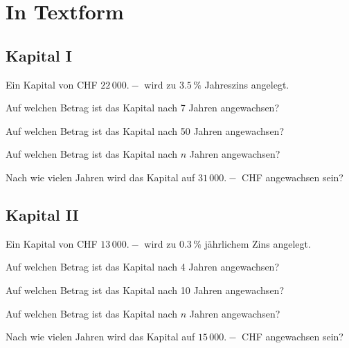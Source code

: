 \seitenUmbruchImAufgabenteil{}
\section{In Textform}
\subsection{Kapital I}
Ein Kapital von CHF $22\,000.-$ wird zu $3.5\,\%$ Jahreszins angelegt.
\begin{bbwAufgabenBlock}
\item Auf welchen Betrag ist das Kapital nach 7 Jahren
angewachsen? 
\item Auf welchen Betrag ist das Kapital nach 50 Jahren
angewachsen?  
\item Auf welchen Betrag ist das Kapital nach $n$ Jahren
angewachsen?   %
\item Nach wie vielen Jahren wird das Kapital auf $31\,000.-$ CHF
angewachsen sein? 
\end{bbwAufgabenBlock}
\platzFuerBerechnungenBisEndeSeite{}
\subsection{Kapital II}
Ein Kapital von CHF $13\,000.-$ wird zu $0.3\,\%$ jährlichem Zins angelegt.
\begin{bbwAufgabenBlock}
\item Auf welchen Betrag ist das Kapital nach 4 Jahren
angewachsen?  
\item Auf welchen Betrag ist das Kapital nach 10 Jahren
angewachsen?  \noTRAINER{\seitenUmbruchImAufgabenteil{}}
\item Auf welchen Betrag ist das Kapital nach $n$ Jahren
angewachsen?   %
\item Nach wie vielen Jahren wird das Kapital auf $15\,000.-$ CHF
angewachsen sein?  
\end{bbwAufgabenBlock}
\platzFuerBerechnungenBisEndeSeite{}
